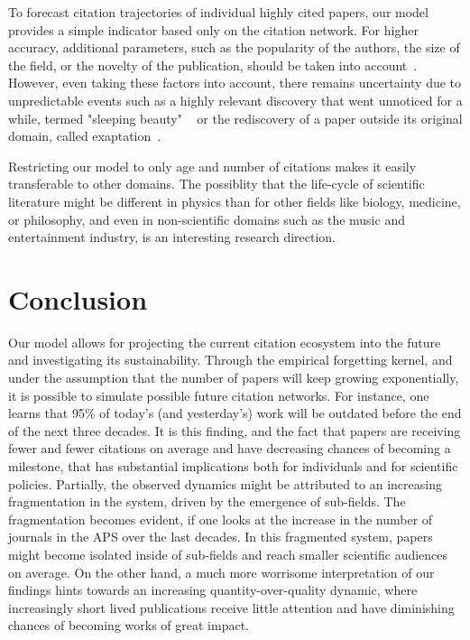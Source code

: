 \documentclass[fleqn,10pt]{wlscirep}
\begin{document}
To forecast citation trajectories of individual highly cited papers, our model provides a simple indicator based only on the citation network.
For higher accuracy, additional parameters, such as the popularity of the authors, the size of the field, or the novelty of the publication, should be taken into account~\cite{ST2020, Klimek2016, Newman2009x, Martin2013, Newman_2014x, Acuna2012, Shen2014, Sinatra2016, Wang2013}. However, even taking these factors into account, there remains uncertainty due to unpredictable events such as a highly relevant discovery that went unnoticed for a while, termed "sleeping beauty" ~\cite{vanRaan2004} or the rediscovery of a paper outside its original domain, called exaptation~\cite{ferreira2020}.

Restricting our model to only age and number of citations makes it easily transferable to other domains. The possiblity that the life-cycle of scientific literature might be different in physics than for other fields like biology, medicine, or philosophy, and even in non-scientific domains such as the music and entertainment industry, is an interesting research direction.

\section*{Conclusion}

Our model allows for projecting the current citation ecosystem into the future and investigating its sustainability. Through the empirical forgetting kernel, and under the assumption that the number of papers will keep growing exponentially, it is possible to simulate possible future citation networks. For instance, one learns that 95\% of today's (and yesterday's) work will be outdated before the end of the next three decades. It is this finding, and the fact that papers are receiving fewer and fewer citations on average and have decreasing chances of becoming a milestone, that has substantial implications both for individuals and for scientific policies. Partially, the observed dynamics might be attributed to an increasing fragmentation in the system, driven by the emergence of sub-fields. The fragmentation becomes evident, if one looks at the increase in the number of journals in the APS over the last decades. In this fragmented system, papers might become isolated inside of sub-fields and reach smaller scientific audiences on average. On the other hand, a much more worrisome interpretation of our findings hints towards an increasing quantity-over-quality dynamic, where increasingly short lived publications receive little attention and have diminishing chances of becoming works of great impact.
\end{document}
